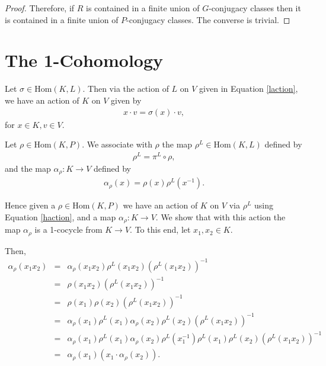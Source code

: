 \begin{proof}
	Therefore, if $R$ is contained in a finite union of $G$-conjugacy classes then it is contained in a finite union of $P$-conjugacy classes. The converse is trivial.
\end{proof}


\section{The 1-Cohomology}
Let $\sigma \in \mathrm{Hom}(K, L)$. Then via the action of $L$ on $V$ given in Equation \ref{laction}, we have an action of $K$ on $V$ given by
\begin{eqnarray} \label{haction} x \cdot v = \sigma(x) \cdot v, \end{eqnarray}
for $x \in K, v \in V$.


\begin{definition} Let $\rho \in \mathrm{Hom}(K, P)$. We associate with $\rho$ the map $\rho^L \in \mathrm{Hom}(K, L)$ defined by
\begin{eqnarray*} \rho^L = \pi^L \circ \rho, \end{eqnarray*}
and the map $\alpha_\rho: K \rightarrow V$ defined by
\begin{eqnarray} \alpha_\rho(x) = \rho(x)\rho^L(x^{-1}). \end{eqnarray}
\end{definition}

Hence given a $\rho \in \mathrm{Hom}(K, P)$ we have an action of $K$ on $V$ via $\rho^L$ using Equation \ref{haction}, and a map $\alpha_\rho:K \rightarrow V$. We show that with this action the map $\alpha_\rho$ is a 1-cocycle from $K \rightarrow V$. To this end, let $x_1, x_2 \in K$.

Then,
\begin{eqnarray*} \alpha_\rho(x_1x_2) &=& \alpha_\rho(x_1x_2) \rho^L(x_1x_2) \left(\rho^L(x_1x_2)\right)^{-1} \\
	&=& \rho(x_1x_2) \left(\rho^L(x_1x_2)\right)^{-1} \\
	&=& \rho(x_1) \rho(x_2) \left(\rho^L(x_1x_2)\right)^{-1} \\
	&=& \alpha_\rho(x_1) \rho^L(x_1) \alpha_\rho(x_2) \rho^L(x_2) \left(\rho^L(x_1x_2)\right)^{-1} \\
	&=& \alpha_\rho(x_1) \rho^L(x_1) \alpha_\rho(x_2) \rho^L(x_1^{-1}) \rho^L(x_1) \rho^L(x_2) \left(\rho^L(x_1x_2)\right)^{-1} \\
	&=& \alpha_\rho(x_1) \left(x_1 \cdot \alpha_\rho(x_2)\right). 
\end{eqnarray*}

